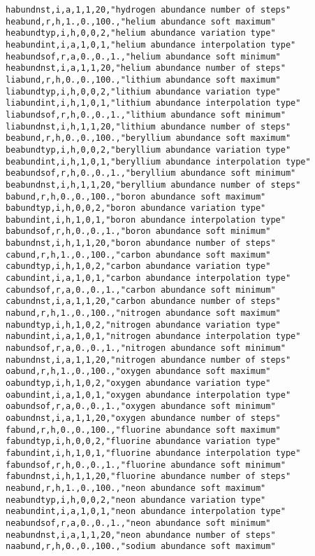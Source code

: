 \begin{verbatim}
habundnst,i,a,1,1,20,"hydrogen abundance number of steps"
heabund,r,h,1.,0.,100.,"helium abundance soft maximum"
heabundtyp,i,h,0,0,2,"helium abundance variation type"
heabundint,i,a,1,0,1,"helium abundance interpolation type"
heabundsof,r,a,0.,0.,1.,"helium abundance soft minimum"
heabundnst,i,a,1,1,20,"helium abundance number of steps"
liabund,r,h,0.,0.,100.,"lithium abundance soft maximum"
liabundtyp,i,h,0,0,2,"lithium abundance variation type"
liabundint,i,h,1,0,1,"lithium abundance interpolation type"
liabundsof,r,h,0.,0.,1.,"lithium abundance soft minimum"
liabundnst,i,h,1,1,20,"lithium abundance number of steps"
beabund,r,h,0.,0.,100.,"beryllium abundance soft maximum"
beabundtyp,i,h,0,0,2,"beryllium abundance variation type"
beabundint,i,h,1,0,1,"beryllium abundance interpolation type"
beabundsof,r,h,0.,0.,1.,"beryllium abundance soft minimum"
beabundnst,i,h,1,1,20,"beryllium abundance number of steps"
babund,r,h,0.,0.,100.,"boron abundance soft maximum"
babundtyp,i,h,0,0,2,"boron abundance variation type"
babundint,i,h,1,0,1,"boron abundance interpolation type"
babundsof,r,h,0.,0.,1.,"boron abundance soft minimum"
babundnst,i,h,1,1,20,"boron abundance number of steps"
cabund,r,h,1.,0.,100.,"carbon abundance soft maximum"
cabundtyp,i,h,1,0,2,"carbon abundance variation type"
cabundint,i,a,1,0,1,"carbon abundance interpolation type"
cabundsof,r,a,0.,0.,1.,"carbon abundance soft minimum"
cabundnst,i,a,1,1,20,"carbon abundance number of steps"
nabund,r,h,1.,0.,100.,"nitrogen abundance soft maximum"
nabundtyp,i,h,1,0,2,"nitrogen abundance variation type"
nabundint,i,a,1,0,1,"nitrogen abundance interpolation type"
nabundsof,r,a,0.,0.,1.,"nitrogen abundance soft minimum"
nabundnst,i,a,1,1,20,"nitrogen abundance number of steps"
oabund,r,h,1.,0.,100.,"oxygen abundance soft maximum"
oabundtyp,i,h,1,0,2,"oxygen abundance variation type"
oabundint,i,a,1,0,1,"oxygen abundance interpolation type"
oabundsof,r,a,0.,0.,1.,"oxygen abundance soft minimum"
oabundnst,i,a,1,1,20,"oxygen abundance number of steps"
fabund,r,h,0.,0.,100.,"fluorine abundance soft maximum"
fabundtyp,i,h,0,0,2,"fluorine abundance variation type"
fabundint,i,h,1,0,1,"fluorine abundance interpolation type"
fabundsof,r,h,0.,0.,1.,"fluorine abundance soft minimum"
fabundnst,i,h,1,1,20,"fluorine abundance number of steps"
neabund,r,h,1.,0.,100.,"neon abundance soft maximum"
neabundtyp,i,h,0,0,2,"neon abundance variation type"
neabundint,i,a,1,0,1,"neon abundance interpolation type"
neabundsof,r,a,0.,0.,1.,"neon abundance soft minimum"
neabundnst,i,a,1,1,20,"neon abundance number of steps"
naabund,r,h,0.,0.,100.,"sodium abundance soft maximum"

\end{verbatim}
